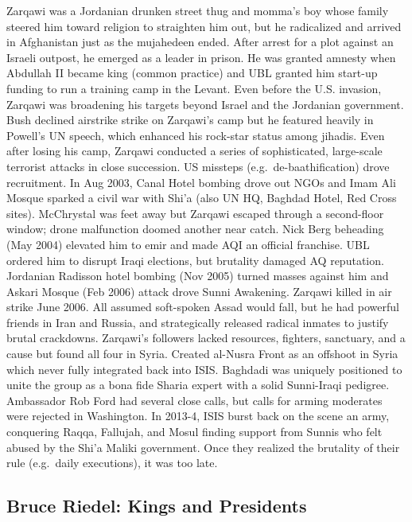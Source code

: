 \documentclass[
]{article}
\begin{document}
Zarqawi was a Jordanian drunken street thug and momma's boy whose family
steered him toward religion to straighten him out, but he radicalized
and arrived in Afghanistan just as the mujahedeen ended. After arrest
for a plot against an Israeli outpost, he emerged as a leader in prison.
He was granted amnesty when Abdullah II became king (common practice)
and UBL granted him start-up funding to run a training camp in the
Levant. Even before the U.S. invasion, Zarqawi was broadening his
targets beyond Israel and the Jordanian government. Bush declined
airstrike strike on Zarqawi's camp but he featured heavily in Powell's
UN speech, which enhanced his rock-star status among jihadis. Even after
losing his camp, Zarqawi conducted a series of sophisticated,
large-scale terrorist attacks in close succession. US missteps
(e.g.~de-baathification) drove recruitment. In Aug 2003, Canal Hotel
bombing drove out NGOs and Imam Ali Mosque sparked a civil war with
Shi'a (also UN HQ, Baghdad Hotel, Red Cross sites). McChrystal was feet
away but Zarqawi escaped through a second-floor window; drone
malfunction doomed another near catch. Nick Berg beheading (May 2004)
elevated him to emir and made AQI an official franchise. UBL ordered him
to disrupt Iraqi elections, but brutality damaged AQ reputation.
Jordanian Radisson hotel bombing (Nov 2005) turned masses against him
and Askari Mosque (Feb 2006) attack drove Sunni Awakening. Zarqawi
killed in air strike June 2006. All assumed soft-spoken Assad would
fall, but he had powerful friends in Iran and Russia, and strategically
released radical inmates to justify brutal crackdowns. Zarqawi's
followers lacked resources, fighters, sanctuary, and a cause but found
all four in Syria. Created al-Nusra Front as an offshoot in Syria which
never fully integrated back into ISIS. Baghdadi was uniquely positioned
to unite the group as a bona fide Sharia expert with a solid Sunni-Iraqi
pedigree. Ambassador Rob Ford had several close calls, but calls for
arming moderates were rejected in Washington. In 2013-4, ISIS burst back
on the scene an army, conquering Raqqa, Fallujah, and Mosul finding
support from Sunnis who felt abused by the Shi'a Maliki government. Once
they realized the brutality of their rule (e.g.~daily executions), it
was too late.

\hypertarget{bruce-riedel-kings-and-presidents}{%
\subsection{Bruce Riedel: Kings and
Presidents}\label{bruce-riedel-kings-and-presidents}}
\end{document}
